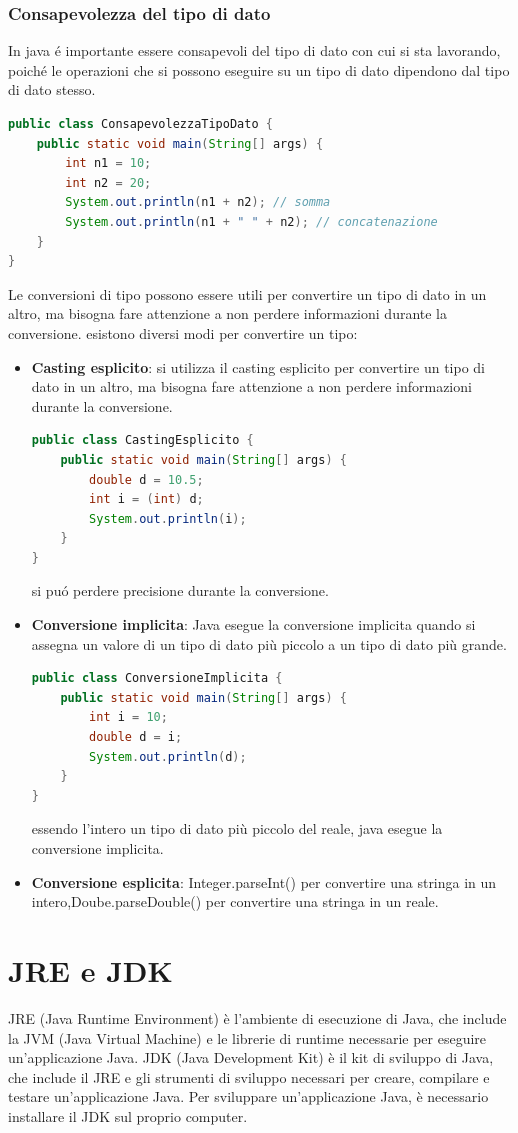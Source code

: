 \documentclass[11pt]{article}
\begin{document}
\subsubsection{Consapevolezza del tipo di dato}
In java é importante essere consapevoli del tipo di dato con cui si sta lavorando, poiché le operazioni che si possono eseguire su un tipo di dato dipendono dal tipo di dato stesso.
\begin{lstlisting}[language=Java]
public class ConsapevolezzaTipoDato {
    public static void main(String[] args) {
        int n1 = 10;
        int n2 = 20;
        System.out.println(n1 + n2); // somma
        System.out.println(n1 + " " + n2); // concatenazione
    }
}
\end{lstlisting}
Le conversioni di tipo possono essere utili per convertire un tipo di dato in un altro, ma bisogna fare attenzione a non perdere informazioni durante la conversione.
esistono diversi modi per convertire un tipo:
\begin{itemize}
    \item \textbf{Casting esplicito}: si utilizza il casting esplicito per convertire un tipo di dato in un altro, ma bisogna fare attenzione a non perdere informazioni durante la conversione.
    \begin{lstlisting}[language=Java]
public class CastingEsplicito {
    public static void main(String[] args) {
        double d = 10.5;
        int i = (int) d;
        System.out.println(i);
    }
}
\end{lstlisting}
si puó perdere precisione durante la conversione.
    \item \textbf{Conversione implicita}: Java esegue la conversione implicita quando si assegna un valore di un tipo di dato più piccolo a un tipo di dato più grande.
    \begin{lstlisting}[language=Java]
public class ConversioneImplicita {
    public static void main(String[] args) {
        int i = 10;
        double d = i;
        System.out.println(d);
    }
}
\end{lstlisting}
    essendo l'intero un tipo di dato più piccolo del reale, java esegue la conversione implicita.
    \item \textbf{Conversione esplicita}: Integer.parseInt() per convertire una stringa in un intero,Doube.parseDouble() per convertire una stringa in un reale.
    \end{itemize}

\section{JRE e JDK}
JRE (Java Runtime Environment) è l'ambiente di esecuzione di Java, che include la JVM (Java Virtual Machine) e le librerie di runtime necessarie per eseguire un'applicazione Java.
JDK (Java Development Kit) è il kit di sviluppo di Java, che include il JRE e gli strumenti di sviluppo necessari per creare, compilare e testare un'applicazione Java.
Per sviluppare un'applicazione Java, è necessario installare il JDK sul proprio computer.
\end{document}
